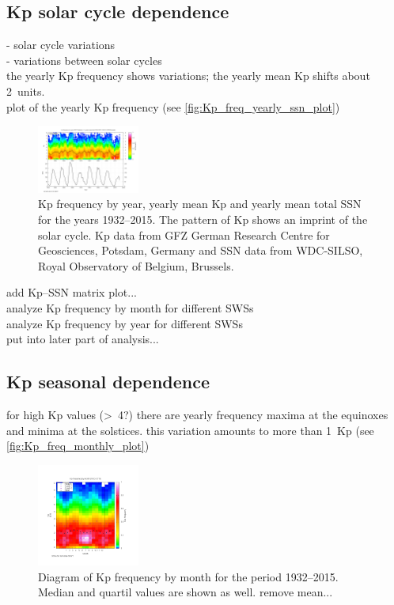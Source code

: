 \subsection{Kp solar cycle dependence}


- solar cycle variations\\
- variations between solar cycles\\

the yearly Kp frequency shows variations; the yearly mean Kp shifts about 2~units.\\
plot of the yearly Kp frequency (see \autoref{fig:Kp_freq_yearly_ssn_plot})
\begin{figure}[htb]
	\centering
	\includegraphics[width=0.3\textwidth]{images/gnuplots/Kp_freq_yearly_ssn_plot.png}
	\caption{Kp frequency by year, yearly mean Kp and yearly mean total SSN for the years 1932--2015. The pattern of Kp shows an imprint of the solar cycle. Kp data from GFZ German Research Centre for Geosciences, Potsdam, Germany and SSN data from WDC-SILSO, Royal Observatory of Belgium, Brussels.}
	\label{fig:Kp_freq_yearly_ssn_plot}
\end{figure}
add Kp--SSN matrix plot...\\

analyze Kp frequency by month for different SWSs\\
analyze Kp frequency by year for different SWSs\\
put into later part of analysis...


\subsection{Kp seasonal dependence}

for high Kp values (>~4?) there are yearly frequency maxima at the equinoxes and minima at the solstices. this variation amounts to more than 1~Kp (see \autoref{fig:Kp_freq_monthly_plot})
\begin{figure}[htb]
	\centering
	\includegraphics[width=0.3\textwidth]{images/gnuplots/Kp_freq_monthly_plot.png}
	\caption{Diagram of Kp frequency by month for the period 1932--2015. Median and quartil values are shown as well. remove mean...}
	\label{fig:Kp_freq_monthly_plot}
\end{figure}

